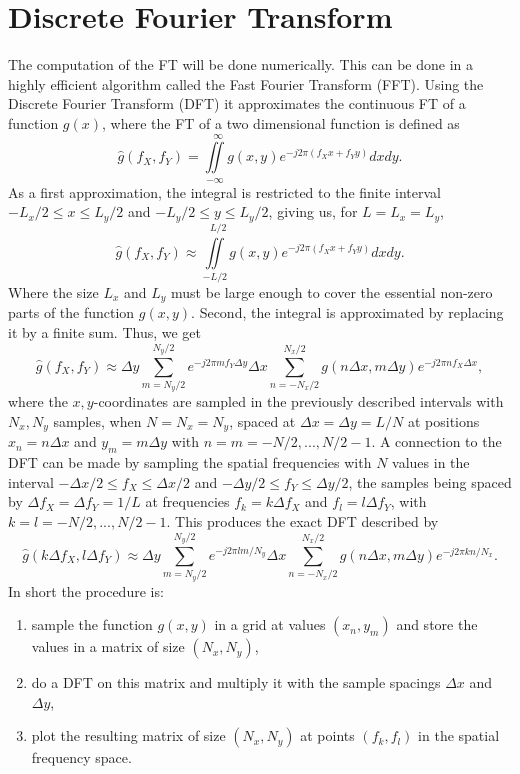 \section{Discrete Fourier Transform}
\label{sec:DFT}
The computation of the FT will be done numerically. This can be done in a highly efficient algorithm called the Fast Fourier Transform (FFT). Using the Discrete Fourier Transform (DFT) it approximates the continuous FT of a function $g(x)$, where the FT of a two dimensional function is defined as
\begin{equation}
\hat{g}(f_X,f_Y)=\iint\limits_{-\infty}^{~~~\infty} g(x,y)e^{-j2\pi(f_Xx + f_Yy)}dxdy.
\end{equation}
As a first approximation, the integral is restricted to the finite interval $-L_x/2 \leq x \leq L_y/2$ and $-L_y/2 \leq y \leq L_y/2$, giving us, for $L=L_x=L_y$,
\begin{equation}
\hat{g}(f_X,f_Y)\approx\iint\limits_{-L/2}^{~~~L/2} g(x,y)e^{-j2\pi(f_Xx + f_Yy)}dxdy.
\end{equation}
Where the size $L_x$ and $L_y$ must be large enough to cover the essential non-zero parts of the function $g(x,y)$. Second, the integral is approximated by replacing it by a finite sum. Thus, we get
\begin{equation}
\hat{g}(f_X,f_Y)\approx  \Delta y \sum\limits_{m=N_y/2}^{N_y/2} e^{-j2\pi mf_Y\Delta y}\Delta x\sum\limits_{n=-N_x/2}^{N_x/2}g(n\Delta x,m\Delta y)e^{-j2\pi nf_X\Delta x },
\end{equation}
where the $x,y$-coordinates are sampled in the previously described intervals with $N_x,N_y$ samples, when $N=N_x=N_y$, spaced at $\Delta x=\Delta y = L/N$ at positions $x_n=n\Delta x$ and $y_m=m\Delta y$ with $n=m=-N/2,...,N/2-1$. A connection to the DFT can be made by sampling the spatial frequencies with $N$ values in the interval $-\Delta x/2 \leq f_X \leq \Delta x/2$ and $-\Delta y/2 \leq f_Y \leq \Delta y/2$, the samples being spaced by $\Delta f_X=\Delta f_Y=1/L$ at frequencies $f_k=k\Delta f_X$ and $f_l=l\Delta f_Y$, with $k=l=-N/2,...,N/2-1$. This produces the exact DFT described by
\begin{equation}
\hat{g}(k\Delta f_X,l\Delta f_Y)\approx  \Delta y \sum\limits_{m=N_y/2}^{N_y/2} e^{-j2\pi lm/N_y}\Delta x\sum\limits_{n=-N_x/2}^{N_x/2}g(n\Delta x,m\Delta y)e^{-j2\pi kn/N_x}.
\end{equation}
In short the procedure is:
\begin{enumerate}
	\item sample the function $g(x,y)$ in a grid at values $(x_n,y_m)$ and store the values in a matrix of size $(N_x,N_y)$,
	\item do a DFT on this matrix and multiply it with the sample spacings $\Delta x$ and $\Delta y$,
	\item plot the resulting matrix of size $(N_x,N_y)$ at points $(f_k,f_l)$ in the spatial frequency space.
\end{enumerate}
